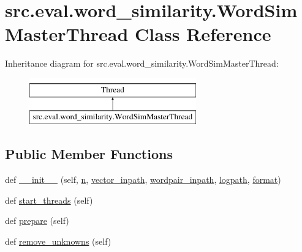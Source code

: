 \hypertarget{classsrc_1_1eval_1_1word__similarity_1_1_word_sim_master_thread}{}\section{src.\+eval.\+word\+\_\+similarity.\+Word\+Sim\+Master\+Thread Class Reference}
\label{classsrc_1_1eval_1_1word__similarity_1_1_word_sim_master_thread}
Inheritance diagram for src.\+eval.\+word\+\_\+similarity.\+Word\+Sim\+Master\+Thread\+:\begin{figure}[H]
\begin{center}
\leavevmode
\includegraphics[height=2.000000cm]{classsrc_1_1eval_1_1word__similarity_1_1_word_sim_master_thread}
\end{center}
\end{figure}
\subsection*{Public Member Functions}
\begin{DoxyCompactItemize}
\item 
def \hyperlink{classsrc_1_1eval_1_1word__similarity_1_1_word_sim_master_thread_ab907f7108ed7e9eff1ba25d8381b03cf}{\+\_\+\+\_\+init\+\_\+\+\_\+} (self, \hyperlink{classsrc_1_1eval_1_1word__similarity_1_1_word_sim_master_thread_a2a61f1955df699b96e3d81dd5359d6f9}{n}, \hyperlink{classsrc_1_1eval_1_1word__similarity_1_1_word_sim_master_thread_ab8cddb103eb1085ebe7905ea6f1ef850}{vector\+\_\+inpath}, \hyperlink{classsrc_1_1eval_1_1word__similarity_1_1_word_sim_master_thread_a1322d5a0ef82c1b69d2cbf4b2f2bb9b0}{wordpair\+\_\+inpath}, \hyperlink{classsrc_1_1eval_1_1word__similarity_1_1_word_sim_master_thread_a3ea3cf72df7f131c3fdd3f55255a97ea}{logpath}, \hyperlink{classsrc_1_1eval_1_1word__similarity_1_1_word_sim_master_thread_a7b9dd6657a3b02d0b2e4e81491179721}{format})
\item 
def \hyperlink{classsrc_1_1eval_1_1word__similarity_1_1_word_sim_master_thread_ace5f55f9accb229fb3200b597e7ee942}{start\+\_\+threads} (self)
\item 
def \hyperlink{classsrc_1_1eval_1_1word__similarity_1_1_word_sim_master_thread_a2c133cae966059ffc9da2269111d310b}{prepare} (self)
\item 
def \hyperlink{classsrc_1_1eval_1_1word__similarity_1_1_word_sim_master_thread_ae6d2f50fc627c37fc7b386be592a258c}{remove\+\_\+unknowns} (self)
\end{DoxyCompactItemize}
